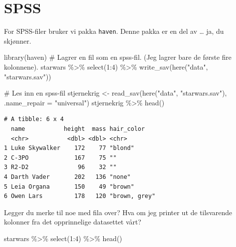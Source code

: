 \documentclass[
  letterpaper,
  DIV=11,
  numbers=noendperiod]{scrreprt}
\newenvironment{Shaded}{\begin{snugshade}}{\end{snugshade}}
\newcommand{\AttributeTok}[1]{\textcolor[rgb]{0.40,0.45,0.13}{#1}}
\newcommand{\CommentTok}[1]{\textcolor[rgb]{0.37,0.37,0.37}{#1}}
\newcommand{\DecValTok}[1]{\textcolor[rgb]{0.68,0.00,0.00}{#1}}
\newcommand{\FunctionTok}[1]{\textcolor[rgb]{0.28,0.35,0.67}{#1}}
\newcommand{\NormalTok}[1]{\textcolor[rgb]{0.00,0.23,0.31}{#1}}
\newcommand{\OtherTok}[1]{\textcolor[rgb]{0.00,0.23,0.31}{#1}}
\newcommand{\SpecialCharTok}[1]{\textcolor[rgb]{0.37,0.37,0.37}{#1}}
\newcommand{\StringTok}[1]{\textcolor[rgb]{0.13,0.47,0.30}{#1}}
\begin{document}
\hypertarget{spss-1}{%
\section{SPSS}\label{spss-1}}

For SPSS-filer bruker vi pakka \texttt{haven}. Denne pakka er en del av
\ldots{} ja, du skjønner.

\begin{Shaded}
\begin{Highlighting}[]
\FunctionTok{library}\NormalTok{(haven)}
\CommentTok{\# Lagrer en fil som en spss{-}fil. (Jeg lagrer bare de første fire kolonnene).}
\NormalTok{starwars }\SpecialCharTok{\%\textgreater{}\%} 
  \FunctionTok{select}\NormalTok{(}\DecValTok{1}\SpecialCharTok{:}\DecValTok{4}\NormalTok{) }\SpecialCharTok{\%\textgreater{}\%} 
  \FunctionTok{write\_sav}\NormalTok{(}\FunctionTok{here}\NormalTok{(}\StringTok{"data"}\NormalTok{, }\StringTok{"starwars.sav"}\NormalTok{))}
\end{Highlighting}
\end{Shaded}

\begin{Shaded}
\begin{Highlighting}[]
\CommentTok{\# Les inn en spss{-}fil}
\NormalTok{stjernekrig }\OtherTok{\textless{}{-}} \FunctionTok{read\_sav}\NormalTok{(}\FunctionTok{here}\NormalTok{(}\StringTok{"data"}\NormalTok{, }\StringTok{"starwars.sav"}\NormalTok{), }\AttributeTok{.name\_repair =} \StringTok{"universal"}\NormalTok{)}
\NormalTok{stjernekrig }\SpecialCharTok{\%\textgreater{}\%} \FunctionTok{head}\NormalTok{()}
\end{Highlighting}
\end{Shaded}

\begin{verbatim}
# A tibble: 6 x 4
  name           height  mass hair_color   
  <chr>           <dbl> <dbl> <chr>        
1 Luke Skywalker    172    77 "blond"      
2 C-3PO             167    75 ""           
3 R2-D2              96    32 ""           
4 Darth Vader       202   136 "none"       
5 Leia Organa       150    49 "brown"      
6 Owen Lars         178   120 "brown, grey"
\end{verbatim}

Legger du merke til noe med fila over? Hva om jeg printer ut de
tilsvarende kolonner fra det opprinnelige datasettet vårt?

\begin{Shaded}
\begin{Highlighting}[]
\NormalTok{starwars }\SpecialCharTok{\%\textgreater{}\%} 
  \FunctionTok{select}\NormalTok{(}\DecValTok{1}\SpecialCharTok{:}\DecValTok{4}\NormalTok{) }\SpecialCharTok{\%\textgreater{}\%} 
  \FunctionTok{head}\NormalTok{()}
\end{Highlighting}
\end{Shaded}
\end{document}
